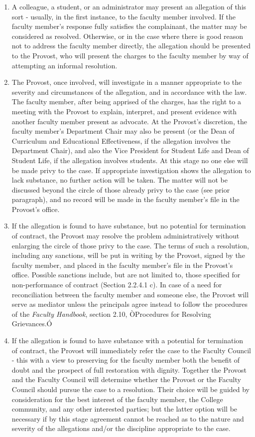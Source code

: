 \documentclass[letterpaper, 11pt]{article}
\begin{document}
				\begin{enumerate}[label=\alph*)]
					\item{A colleague, a student, or an administrator may present an allegation of this sort - usually, in the first instance, to the faculty member involved.  If the faculty member's response fully satisfies the complainant, the matter may be considered as resolved.  Otherwise, or in the case where there is good reason not to address the faculty member directly, the allegation should be presented to the Provost, who will present the charges to the faculty member by way of attempting an informal resolution.}
					\item{The Provost, once involved, will investigate in a manner appropriate to the severity and circumstances of the allegation, and in accordance with the law.  The faculty member, after being apprised of the charges, has the right to a meeting with the Provost to explain, interpret, and present evidence with another faculty member present as advocate.  At the Provost's discretion, the faculty member's Department Chair may also be present (or the Dean of Curriculum and Educational Effectiveness, if the allegation involves the Department Chair), and also the Vice President for Student Life and Dean of Student Life, if the allegation involves students.  At this stage no one else will be made privy to the case.}
					If appropriate investigation shows the allegation to lack substance, no further action will be taken.  The matter will not be discussed beyond the circle of those already privy to the case (see prior paragraph), and no record will be made in the faculty member's file in the Provost's office.
					\item{If the allegation is found to have substance, but no potential for termination of contract, the Provost may resolve the problem administratively without enlarging the circle of those privy to the case.  The terms of such a resolution, including any sanctions, will be put in writing by the Provost, signed by the faculty member, and placed in the faculty member's file in the Provost's office.  Possible sanctions include, but are not limited to, those specified for non-performance of contract (Section 2.2.4.1 c).  In case of a need for reconciliation between the faculty member and someone else, the Provost will serve as mediator unless the principals agree instead to follow the procedures of the \emph{Faculty Handbook}, section 2.10, ÒProcedures for Resolving Grievances.Ó}
					\item{If the allegation is found to have substance with a potential for termination of contract, the Provost will immediately refer the case to the Faculty Council - this with a view to preserving for the faculty member both the benefit of doubt and the prospect of full restoration with dignity.  Together the Provost and the Faculty Council will determine whether the Provost or the Faculty Council should pursue the case to a resolution.  Their choice will be guided by consideration for the best interest of the faculty member, the College community, and any other interested parties; but the latter option will be necessary if by this stage agreement cannot be reached as to the nature and severity of the allegations and/or the discipline appropriate to the case.
}
\end{enumerate}
\end{document}

